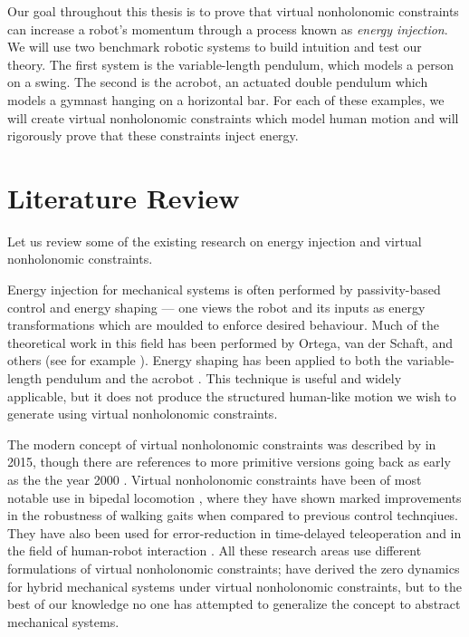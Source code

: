 Our goal throughout this thesis is to prove that virtual
nonholonomic constraints can increase a robot's momentum through a
process known as \textit{energy injection}.
We will use two benchmark robotic systems to build intuition and test
our theory.
The first system is the variable-length pendulum, which models a person
on a swing.
The second is the acrobot, an actuated double pendulum which models a gymnast
hanging on a horizontal bar.
For each of these examples, we will create virtual nonholonomic
constraints which model human motion and will rigorously prove that these
constraints inject energy. 

\section{Literature Review}
Let us review some of the existing research on energy injection and virtual
nonholonomic constraints.

Energy injection for mechanical systems is often performed by passivity-based
control and energy shaping --- one views the robot and its inputs as energy
transformations which are moulded to enforce desired behaviour.
Much of the theoretical work in this field has been performed by Ortega, van der
Schaft, and others (see for example \cite{ida_pbc_underactuation_one,
ida_pbc_acrobot_example,energy_shaping_revisited}).
Energy shaping has been applied to both the variable-length
pendulum \cite{vlp_energy_shaping} and the acrobot
\cite{swingup_acrobot_energy,swingup_giant_acrobot}.
This technique is useful and widely applicable, but it does not
produce the structured human-like motion we wish to generate using virtual
nonholonomic constraints.

The modern concept of virtual nonholonomic constraints was described by
\citet{nhvc_dynamic_walking} in 2015, though there are references to more
primitive versions going back as early as the the year 2000
\cite{vnhc_human_robot_cooperation}.
Virtual nonholonomic constraints have been of most notable use in
bipedal locomotion \cite{nhvc_incline_walking,output_nhvc_bipedal_control},
where they have shown marked improvements in the robustness of walking gaits
when compared to previous control technqiues.
They have also been used for error-reduction in time-delayed teleoperation
\cite{vnhc_time_delay_teleop} and in the field of human-robot interaction
\cite{psd_based_vnhc_redundant_manipulator,haptic_vnhc}.
All these research areas use different formulations of virtual nonholonomic constraints;
\citet{hybrid_zero_dynamics_bipedal_nhvcs} have derived the 
zero dynamics for hybrid mechanical systems under virtual nonholonomic
constraints, but to the best of our knowledge no one has attempted to generalize
the concept to abstract mechanical systems.

